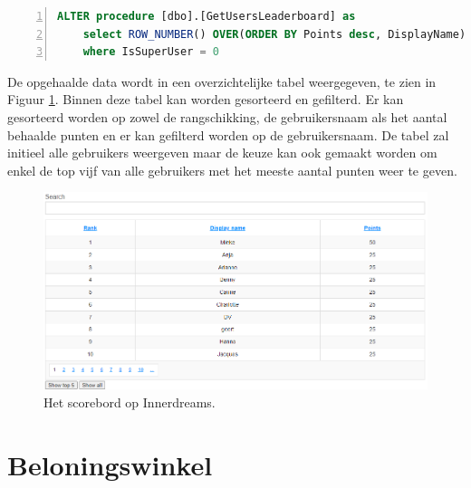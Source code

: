 \begin{lstlisting}[caption={De GetUsersLeaderboard stored procedure.},
    label={lst:gul},
    language=SQL,
    showspaces=false,
    basicstyle=\ttfamily,
    numbers=left,
    numberstyle=\tiny,
    numbersep=1pt,
    breaklines=true
    commentstyle=\color{gray}]
    ALTER procedure [dbo].[GetUsersLeaderboard] as
    select ROW_NUMBER() OVER(ORDER BY Points desc, DisplayName) as Rank, DisplayName, Points from dbo.Users
    where IsSuperUser = 0
\end{lstlisting}

De opgehaalde data wordt in een overzichtelijke tabel weergegeven, te zien in Figuur \ref{fig:leaderboardinnerdreams}. Binnen deze tabel kan worden gesorteerd en gefilterd. Er kan gesorteerd worden op zowel de rangschikking, de gebruikersnaam als het aantal behaalde punten en er kan gefilterd worden op de gebruikersnaam. De tabel zal initieel alle gebruikers weergeven maar de keuze kan ook gemaakt worden om enkel de top vijf van alle gebruikers met het meeste aantal punten weer te geven.

\begin{figure}
    \includegraphics[width=\linewidth]{LeaderboardInnerdreams.png}
    \caption{Het scorebord op Innerdreams.}
    \label{fig:leaderboardinnerdreams}
\end{figure}

\section{Beloningswinkel}


